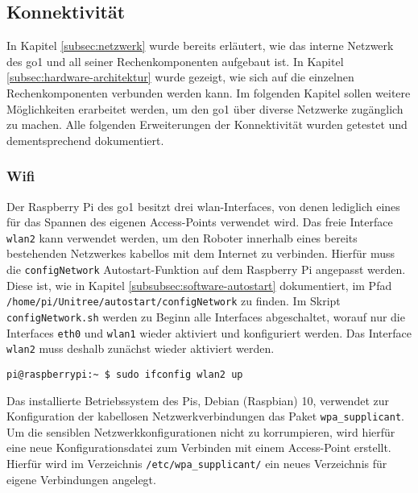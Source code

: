 \subsection{Konnektivität}
\label{subsec:konnektivitat}

In Kapitel \ref{subsec:netzwerk} wurde bereits erläutert, wie das interne Netzwerk des \gls{go1} und all seiner
Rechenkomponenten aufgebaut ist.
In Kapitel \ref{subsec:hardware-architektur} wurde gezeigt, wie sich auf die einzelnen Rechenkomponenten verbunden werden kann.
Im folgenden Kapitel sollen weitere Möglichkeiten erarbeitet werden, um den \gls{go1} über diverse Netzwerke zugänglich zu machen.
Alle folgenden Erweiterungen der Konnektivität wurden getestet und dementsprechend dokumentiert.

\subsubsection*{Wifi}
\label{subsubsec:wifi}

Der Raspberry Pi des \gls{go1} besitzt drei \gls{wlan}-Interfaces, von denen lediglich eines für das Spannen des eigenen
Access-Points verwendet wird.
Das freie Interface \texttt{wlan2} kann verwendet werden, um den Roboter innerhalb eines bereits bestehenden Netzwerkes kabellos
mit dem Internet zu verbinden.
Hierfür muss die \texttt{configNetwork} Autostart-Funktion auf dem Raspberry Pi angepasst werden.
Diese ist, wie in Kapitel \ref{subsubsec:software-autostart} dokumentiert, im Pfad
\texttt{/home/\allowbreak pi/\allowbreak Unitree/\allowbreak autostart/\allowbreak configNetwork} zu finden.
Im Skript \texttt{configNetwork.sh} werden zu Beginn alle Interfaces abgeschaltet, worauf nur die Interfaces \texttt{eth0}
und \texttt{wlan1} wieder aktiviert und konfiguriert werden.
Das Interface \texttt{wlan2} muss deshalb zunächst wieder aktiviert werden.

\begin{lstlisting}
pi@raspberrypi:~ $ sudo ifconfig wlan2 up
\end{lstlisting}


Das installierte Betriebssystem des Pis, Debian (Raspbian) \num{10}, verwendet zur Konfiguration der kabellosen Netzwerkverbindungen
das Paket \texttt{wpa\_supplicant}.
Um die sensiblen Netzwerkkonfigurationen nicht zu korrumpieren, wird hierfür eine neue Konfigurationsdatei zum Verbinden
mit einem Access-Point erstellt.
Hierfür wird im Verzeichnis \texttt{/etc/wpa\_supplicant/} ein neues Verzeichnis für eigene Verbindungen angelegt.

